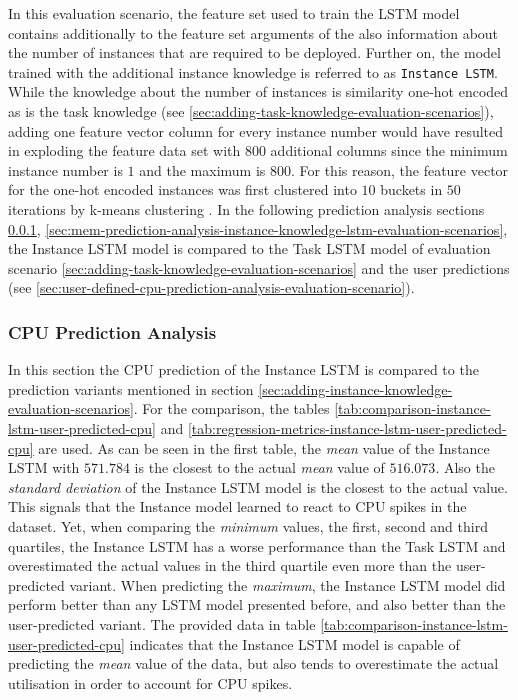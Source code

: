     In this evaluation scenario, the feature set used to train the LSTM model contains additionally to the feature set arguments of the  also information about the number of instances that are required to be deployed.
    Further on, the model trained with the additional instance knowledge is referred to as \texttt{Instance LSTM}.
    While the knowledge about the number of instances is similarity one-hot encoded as is the task knowledge (see \ref{sec:adding-task-knowledge-evaluation-scenarios}), adding one feature vector column for every instance number would have resulted in exploding the feature data set with 800 additional columns since the minimum instance number is $1$ and the maximum is $800$.
    For this reason, the feature vector for the one-hot encoded instances was first clustered into $10$ buckets in $50$ iterations by k-means clustering \cite{hartiganAlgorithm136Kmeans1979}.
    In the following prediction analysis sections \ref{sec:cpu-prediction-analysis-instance-knowledge-lstm-evaluation-scenarios}, \ref{sec:mem-prediction-analysis-instance-knowledge-lstm-evaluation-scenarios}, the Instance LSTM model is compared to the Task LSTM model of evaluation scenario \ref{sec:adding-task-knowledge-evaluation-scenarios} and the user predictions (see \ref{sec:user-defined-cpu-prediction-analysis-evaluation-scenario}).

    \subsubsection{CPU Prediction Analysis}
    \label{sec:cpu-prediction-analysis-instance-knowledge-lstm-evaluation-scenarios}

      In this section the CPU prediction of the Instance LSTM is compared to the prediction variants mentioned in section \ref{sec:adding-instance-knowledge-evaluation-scenarios}.
      For the comparison, the tables \ref{tab:comparison-instance-lstm-user-predicted-cpu} and \ref{tab:regression-metrics-instance-lstm-user-predicted-cpu} are used.
      As can be seen in the first table, the \emph{mean} value of the Instance LSTM with $571.784$ is the closest to the actual \emph{mean} value of $516.073$. Also the \emph{standard deviation} of the Instance LSTM model is the closest to the actual value. This signals that the Instance model learned to react to CPU spikes in the dataset.
      Yet, when comparing the \emph{minimum} values, the first, second and third quartiles, the Instance LSTM has a worse performance than the Task LSTM and overestimated the actual values in the third quartile even more than the user-predicted variant.
      When predicting the \emph{maximum}, the Instance LSTM model did perform better than any LSTM model presented before, and also better than the user-predicted variant.
      The provided data in table \ref{tab:comparison-instance-lstm-user-predicted-cpu} indicates that the Instance LSTM model is capable of predicting the \emph{mean} value of the data, but also tends to overestimate the actual utilisation in order to account for CPU spikes.

